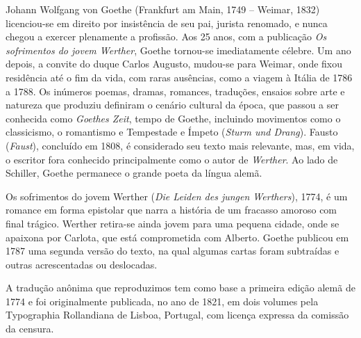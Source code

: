Johann Wolfgang von Goethe (Frankfurt am Main, 1749 -- Weimar, 1832)
licenciou-se em direito por insistência de seu pai, jurista renomado, e nunca
chegou a exercer plenamente a profissão.  Aos 25 anos, com a publicação
\textit{Os sofrimentos do jovem Werther}, Goethe tornou-se imediatamente
célebre. Um ano depois, a convite do duque Carlos Augusto, mudou-se para
Weimar, onde fixou residência até o fim da vida, com raras ausências, como a
viagem à Itália de 1786 a 1788. Os inúmeros poemas, dramas, romances,
traduções, ensaios sobre arte e natureza que produziu definiram o cenário
cultural da época, que passou a ser conhecida como \textit{Goethes Zeit}, tempo
de Goethe, incluindo movimentos como o classicismo, o romantismo e Tempestade e
Ímpeto (\textit{Sturm und Drang}). Fausto (\textit{Faust}), concluído em 1808,
é considerado seu texto mais relevante, mas, em vida, o escritor fora conhecido
principalmente como o autor de \textit{Werther}.  Ao lado de Schiller, Goethe
permanece o grande poeta da língua alemã.

Os sofrimentos do jovem Werther (\textit{Die Leiden des jungen Werthers}),
1774, é um romance em forma epistolar que narra a história
de um fracasso amoroso com final trágico. Werther retira-se ainda
jovem para uma pequena cidade, onde se apaixona por Carlota,
que está comprometida com Alberto. Goethe publicou
em 1787 uma segunda versão do texto, na qual algumas cartas
foram subtraídas e outras acrescentadas ou deslocadas.

A tradução anônima que reproduzimos tem como base a primeira
edição alemã de 1774 e foi originalmente publicada, no ano de
1821, em dois volumes pela Typographia Rollandiana de Lisboa,
Portugal, com licença expressa da comissão da censura.


